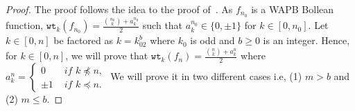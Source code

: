 \documentclass{article}[12pt]
\newcommand{\wt}{\mathtt{wt}}
\begin{document}
\begin{proof}
The proof follows the idea to the proof of~\cite[Theorem 3]{MS21}. As $f_{n_0}$ is a WAPB Bollean function, $\displaystyle{\wt_k(f_{n_0})= \frac{{n_0 \choose k} + a_k^{n_0}}{2}}$ such that $a_k^{n_0} \in \{0, \pm 1\}$ for $k \in [0,n_0]$. Let $k \in [0,n]$ be factored as $k = k_02^{b}$ where $k_0$ is odd and $b \geq 0$ is an integer. Hence, for $k \in [0,n]$, we will prove that $\displaystyle{\wt_k(f_n) = \frac{{n \choose k} + a_k^n}{2}}$ where $a_k^n = \begin{cases}
  0  & \textit{ if }  k \npreceq n, \\                                                                                                                                                                                                                                                                                                                                                               
  \pm 1  & \textit{ if }  k \preceq n.                                                                                                                                                                                                                                                                                                                                                               \end{cases}$
We will prove it in two different cases i.e, (1) $m > b$ and (2) $m \leq b$.



\end{proof}
\end{document}
